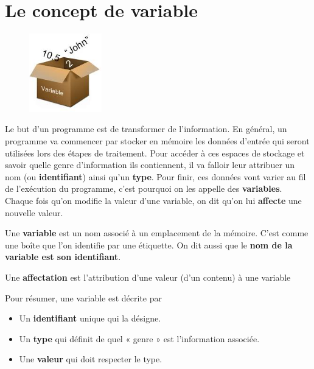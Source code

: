 \vspace{-0.8cm}
\section{Le concept de variable}
\begin{figure}
	\includegraphics[trim=0 0 0 45,width=0.28\textwidth]{Images/variables/variables}
\end{figure}
Le but d'un programme est de transformer de l'information. En général, un programme va commencer par stocker en mémoire les données d’entrée qui seront utilisées lors des étapes de traitement. Pour accéder à ces espaces de stockage et savoir quelle genre d'information ils contiennent, il va falloir leur attribuer un nom (ou \textbf{identifiant}) ainsi qu'un \textbf{type}. Pour finir, ces données vont varier au fil de l'exécution du programme, c'est pourquoi on les appelle des \textbf{variables}. Chaque fois qu'on modifie la valeur d'une variable, on dit qu'on lui \textbf{affecte} une nouvelle valeur.
\begin{mydefinitions}
	\item  Une \textbf{variable} est un nom associé à un emplacement de la mémoire. C’est comme une boîte que l’on identifie par une étiquette. On dit aussi que le \textbf{nom de la variable est son identifiant}.
	\item Une \textbf{affectation} est l’attribution d’une valeur (d’un contenu) à une variable
\end{mydefinitions}
Pour résumer, une variable est décrite par
\begin{itemize}
	\item Un \textbf{identifiant} unique qui la désigne.
	\item Un \textbf{type} qui définit de quel « genre » est l’information associée.
	\item Une \textbf{valeur} qui doit respecter le type.
\end{itemize}


